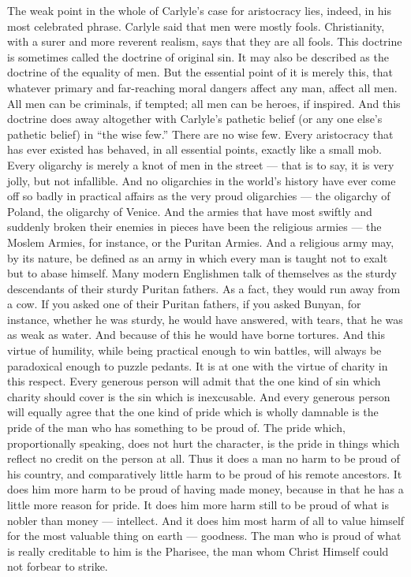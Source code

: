 The weak point in the whole of Carlyle’s case for aristocracy lies, indeed, in his most celebrated phrase. Carlyle said that men were mostly fools. Christianity, with a surer and more reverent realism, says that they are all fools. This doctrine is sometimes called the doctrine of original sin. It may also be described as the doctrine of the equality of men. But the essential point of it is merely this, that whatever primary and far-reaching moral dangers affect any man, affect all men. All men can be criminals, if tempted; all men can be heroes, if inspired. And this doctrine does away altogether with Carlyle’s pathetic belief (or any one else’s pathetic belief) in “the wise few.” There are no wise few. Every aristocracy that has ever existed has behaved, in all essential points, exactly like a small mob. Every oligarchy is merely a knot of men in the street — that is to say, it is very jolly, but not infallible. And no oligarchies in the world’s history have ever come off so badly in practical affairs as the very proud oligarchies — the oligarchy of Poland, the oligarchy of Venice. And the armies that have most swiftly and suddenly broken their enemies in pieces have been the religious armies — the Moslem Armies, for instance, or the Puritan Armies. And a religious army may, by its nature, be defined as an army in which every man is taught not to exalt but to abase himself. Many modern Englishmen talk of themselves as the sturdy descendants of their sturdy Puritan fathers. As a fact, they would run away from a cow. If you asked one of their Puritan fathers, if you asked Bunyan, for instance, whether he was sturdy, he would have answered, with tears, that he was as weak as water. And because of this he would have borne tortures. And this virtue of humility, while being practical enough to win battles, will always be paradoxical enough to puzzle pedants. It is at one with the virtue of charity in this respect. Every generous person will admit that the one kind of sin which charity should cover is the sin which is inexcusable. And every generous person will equally agree that the one kind of pride which is wholly damnable is the pride of the man who has something to be proud of. The pride which, proportionally speaking, does not hurt the character, is the pride in things which reflect no credit on the person at all. Thus it does a man no harm to be proud of his country, and comparatively little harm to be proud of his remote ancestors. It does him more harm to be proud of having made money, because in that he has a little more reason for pride. It does him more harm still to be proud of what is nobler than money — intellect. And it does him most harm of all to value himself for the most valuable thing on earth — goodness. The man who is proud of what is really creditable to him is the Pharisee, the man whom Christ Himself could not forbear to strike.

